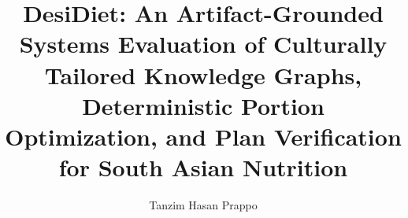 \documentclass[5p,times,twocolumn]{elsarticle}
\makeatletter
\def\systemname{DesiDiet}%
\def\corref#1{}%
\def\cortext[#1]#2{}%
\def\my@bx{bx}
\def\my@b{b}
\DeclareRobustCommand{\systemname}{%
  \texorpdfstring{%
    \ifx\f@series\my@bx
      DesiDiet%
    \else\ifx\f@series\my@b
      DesiDiet%
    \else
      \textsc{DesiDiet}%
    \fi\fi
  }{DesiDiet}%
}
\makeatother
\begin{document}
\begin{frontmatter}

\title{\systemname{}: An Artifact-Grounded Systems Evaluation of Culturally Tailored Knowledge Graphs, Deterministic Portion Optimization, and Plan Verification for South Asian Nutrition}

\author[1]{Tanzim Hasan Prappo\texorpdfstring{\corref{cor1}}{}}
\cortext[cor1]{Corresponding author}


\begin{abstract}

\end{abstract}
\end{frontmatter}
\end{document}
